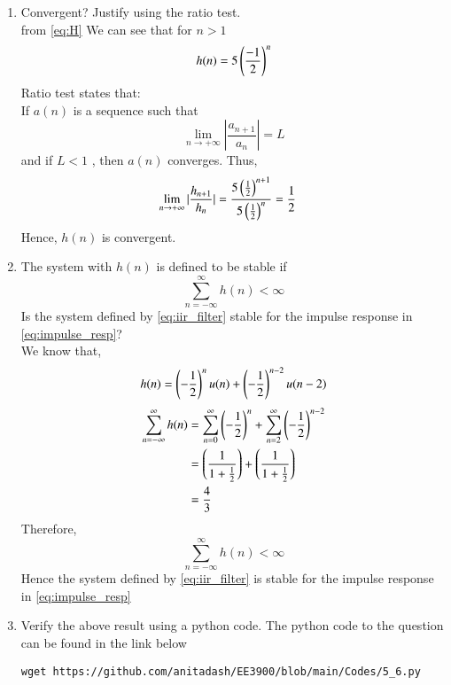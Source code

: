 \documentclass[journal,12pt,twocolumn]{IEEEtran}
\renewcommand\thesection{\arabic{section}}
\begin{document}
\begin{enumerate}[label=\thesection.\arabic*]
\item Convergent? Justify using the ratio test.
\\
\solution from \eqref{eq:H} We can see that for $n>1$ 
\begin{equation}
h(n) = 5\left(\frac{-1}{2}\right)^n
\end{equation}
Ratio test states that:\\
If $a(n)$ is a sequence such that
\begin{equation}
\lim_{n \to+\infty}|\frac{a_{n+1}}{a_{n}}| = L
\end{equation}
and if $L<1$ , then $a(n)$ converges. Thus,
\begin{align}
\lim_{n \to+\infty}|\frac{h_{n+1}}{h_{n}}| = \frac{5\left(\frac{1}{2}\right)^{n+1}}{5\left(\frac{1}{2}\right)^n}
&= \frac{1}{2}
\end{align}
Hence, $h(n)$ is convergent.


\item The system with $h(n)$ is defined to be stable if
\begin{equation}
\sum_{n=-\infty}^{\infty}h(n) < \infty
\end{equation}
Is the system defined by \eqref{eq:iir_filter} stable for the impulse response in \eqref{eq:impulse_resp}?
\\
\solution
We know that,
\begin{equation}
    h(n) = \left(-\frac{1}{2}\right)^{n}u(n) + \left(-\frac{1}{2}\right)^{n-2}u(n-2)
\end{equation}
\begin{align}
\sum_{n=-\infty}^{\infty}h(n)&=\sum_{n=0}^{\infty}\left(-\frac{1}{2}\right)^{n}+\sum_{n=2}^{\infty}\left(-\frac{1}{2}\right)^{n-2}
\\
&= \left(\frac{1}{1+\frac{1}{2}}\right) + \left(\frac{1}{1+\frac{1}{2}}\right)
\\
&=\frac{4}{3}
\end{align}
Therefore,
\begin{equation}
\sum_{n=-\infty}^{\infty}h(n) < \infty
\end{equation}
Hence the system defined by \eqref{eq:iir_filter} is stable for the impulse response in \eqref{eq:impulse_resp}


\item Verify the above result using a python code.
\solution The python code to the question can be found in the link below
\begin{lstlisting}
wget https://github.com/anitadash/EE3900/blob/main/Codes/5_6.py
\end{lstlisting}



\end{enumerate}
\end{document}

